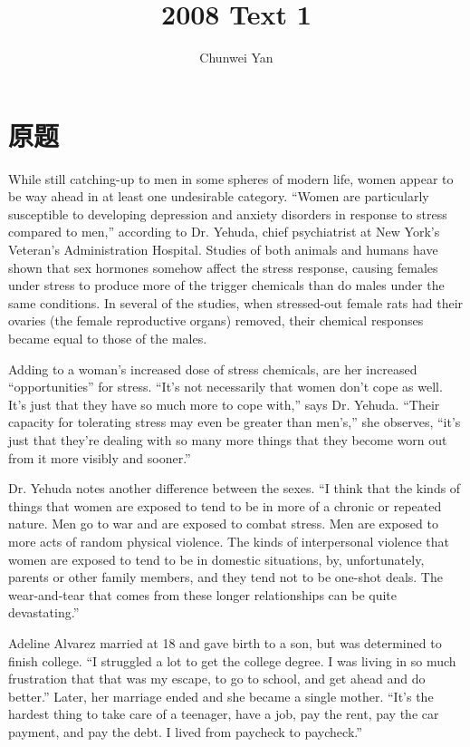 \documentclass[a4paper]{ctexart}
\author{Chunwei Yan}
\title{2008 Text 1}
\begin{document}
    \maketitle

\section{原题}
While still catching-up to men in some spheres of modern life, women appear to be way ahead in at least one undesirable category. “Women are particularly susceptible to developing depression and anxiety disorders in response to stress compared to men,” according to Dr. Yehuda, chief psychiatrist at New York’s Veteran’s Administration Hospital.
Studies of both animals and humans have shown that sex hormones somehow affect the stress response, causing females under stress to produce more of the trigger chemicals than do males under the same conditions. In several of the studies, when stressed-out female rats had their ovaries (the female reproductive organs) removed, their chemical responses became equal to those of the males.
\par
Adding to a woman’s increased dose of stress chemicals, are her increased “opportunities” for stress. “It’s not necessarily that women don’t cope as well. It’s just that they have so much more to cope with,” says Dr. Yehuda. “Their capacity for tolerating stress may even be greater than men’s,” she observes, “it’s just that they’re dealing with so many more things that they become worn out from it more visibly and sooner.”
\par
Dr. Yehuda notes another difference between the sexes. “I think that the kinds of things that women are exposed to tend to be in more of a chronic or repeated nature. Men go to war and are exposed to combat stress. Men are exposed to more acts of random physical violence. The kinds of interpersonal violence that women are exposed to tend to be in domestic situations, by, unfortunately, parents or other family members, and they tend not to be one-shot deals. The wear-and-tear that comes from these longer relationships can be quite devastating.”
\par
Adeline Alvarez married at 18 and gave birth to a son, but was determined to finish college. “I struggled a lot to get the college degree. I was living in so much frustration that that was my escape, to go to school, and get ahead and do better.” Later, her marriage ended and she became a single mother. “It’s the hardest thing to take care of a teenager, have a job, pay the rent, pay the car payment, and pay the debt. I lived from paycheck to paycheck.”
\end{document}
